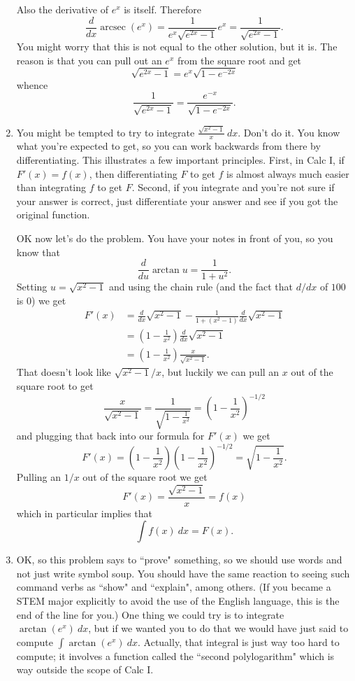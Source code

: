 \documentclass[reqno,12pt,letterpaper]{amsart}
\DeclareMathOperator{\arcsec}{arcsec}
\theoremstyle{definition}
\numberwithin{equation}{section}
\begin{document}
\begin{enumerate}
Also the derivative of $e^x$ is itself. Therefore
$$\frac{d}{dx} \arcsec(e^x) = \frac{1}{e^x \sqrt{e^{2x} - 1}} e^x = \frac{1}{\sqrt{e^{2x} - 1}}.$$
You might worry that this is not equal to the other solution, but it is. The reason is that you can pull out an $e^x$ from the square root and get
$$\sqrt{e^{2x} - 1} = e^x\sqrt{1 - e^{-2x}}$$
whence
$$\frac{1}{\sqrt{e^{2x} - 1}} = \frac{e^{-x}}{\sqrt{1 - e^{-2x}}}.$$
\item You might be tempted to try to integrate $\frac{\sqrt{x^2 - 1}}{x} ~dx$.
Don't do it. You know what you're expected to get, so you can work backwards from there by differentiating.
This illustrates a few important principles.
First, in Calc I, if $F'(x) = f(x)$, then differentiating $F$ to get $f$ is almost always much easier than integrating $f$ to get $F$.
Second, if you integrate and you're not sure if your answer is correct, just differentiate your answer and see if you got the original function.

OK now let's do the problem. You have your notes in front of you, so you know that
$$\frac{d}{du} \arctan u = \frac{1}{1 + u^2}.$$
Setting $u = \sqrt{x^2 - 1}$ and using the chain rule (and the fact that $d/dx$ of $100$ is $0$) we get
\begin{align*}
F'(x) &= \frac{d}{dx}\sqrt{x^2 - 1} - \frac{1}{1 + (x^2 - 1)} \frac{d}{dx} \sqrt{x^2 - 1} \\
&= \left(1 - \frac{1}{x^2}\right) \frac{d}{dx} \sqrt{x^2 - 1}\\
&= \left(1 - \frac{1}{x^2}\right) \frac{x}{\sqrt{x^2 - 1}}.
\end{align*}
That doesn't look like $\sqrt{x^2 - 1}/x$, but luckily we can pull an $x$ out of the square root to get
$$\frac{x}{\sqrt{x^2 - 1}} = \frac{1}{\sqrt{1 - \frac{1}{x^2}}} = \left(1 - \frac{1}{x^2}\right)^{-1/2}$$
and plugging that back into our formula for $F'(x)$ we get
$$F'(x) = \left(1 - \frac{1}{x^2}\right)  \left(1 - \frac{1}{x^2}\right)^{-1/2} = \sqrt{1 - \frac{1}{x^2}}.$$
Pulling an $1/x$ out of the square root we get
$$F'(x) = \frac{\sqrt{x^2 - 1}}{x} = f(x)$$
which in particular implies that
$$\int f(x) ~dx = F(x).$$
\item OK, so this problem says to ``prove" something, so we should use words and not just write symbol soup.
You should have the same reaction to seeing such command verbs as ``show" and ``explain", among others.
(If you became a STEM major explicitly to avoid the use of the English language, this is the end of the line for you.)
One thing we could try is to integrate $\arctan(e^x) ~dx$, but if we wanted you to do that we would have just said to compute $\int \arctan(e^x) ~dx$.
Actually, that integral is just way too hard to compute; it involves a function called the ``second polylogarithm" which is way outside the scope of Calc I.


\end{enumerate}
\end{document}
